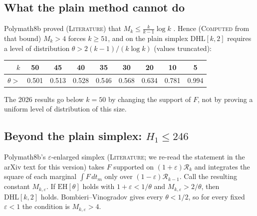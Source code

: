 \documentclass[11pt]{amsart}
\theoremstyle{definition}
\theoremstyle{remark}
\newcommand{\lbl}[1]{\textup{\textsc{#1}}}
\newcommand{\DHL}{\mathrm{DHL}}
\newcommand{\R}{\mathcal{R}}
\begin{document}
\subsection{What the plain method cannot do}
Polymath8b proved (\lbl{Literature}) that $M_k\le\frac{k}{k-1}\log k$
\cite{Pol14b}. Hence
(\lbl{Computed} from that bound) $M_k>4$ forces $k\ge51$, and on the plain
simplex $\DHL[k,2]$ requires a level of distribution
$\theta>2(k-1)/(k\log k)$ (values truncated):
\begin{center}
\begin{tabular}{@{}rcccccccc@{}}
\toprule
$k$ & 50 & 45 & 40 & 35 & 30 & 20 & 10 & 5\\
\midrule
$\theta>$ & 0.501 & 0.513 & 0.528 & 0.546 & 0.568 & 0.634 & 0.781 & 0.994\\
\bottomrule
\end{tabular}
\end{center}
The 2026 results go below $k=50$ by changing the support of $F$, not by
proving a uniform level of distribution of this size.

\subsection{Beyond the plain simplex: \texorpdfstring{$H_1\le246$}{H1 <= 246}}
Polymath8b's $\varepsilon$-enlarged simplex \cite[Thm.~3.12]{Pol14b}
(\lbl{Literature}; we re-read the statement in the arXiv text for this
version) takes $F$ supported on $(1+\varepsilon)\R_k$ and integrates the
square of each marginal $\int F\,dt_m$ only over $(1-\varepsilon)\R_{k-1}$.
Call the resulting constant $M_{k,\varepsilon}$. If $\mathrm{EH}[\theta]$
holds with $1+\varepsilon<1/\theta$ and $M_{k,\varepsilon}>2/\theta$, then
$\DHL[k,2]$ holds. Bombieri--Vinogradov gives every $\theta<1/2$, so for
every fixed $\varepsilon<1$ the condition is $M_{k,\varepsilon}>4$.
\end{document}
